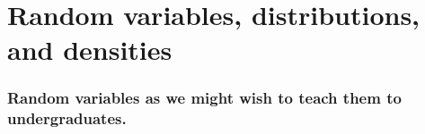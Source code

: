

\part*{Random variables, distributions, and densities}%

\section{Random variables as we might wish to teach them to
  undergraduates.}

